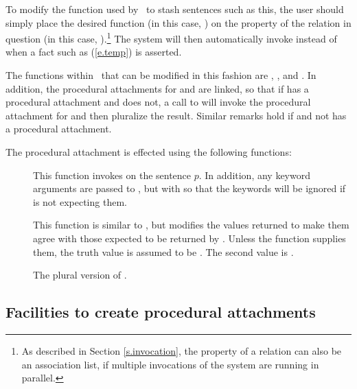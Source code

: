 To modify the function used by \mvl\ to stash sentences such as this,
the user should simply place the desired function (in this case,
) on the  property of the relation in
question (in this case, ).\footnote{As described in
Section \ref{s.invocation}, the  property of a relation
can also be an association list, if multiple invocations of the
system are running in parallel.} The system will then automatically
invoke  instead of  when a fact such
as (\ref{e.temp}) is asserted.

The functions within \mvl\ that can be modified in this fashion are
, ,  and .  In
addition, the procedural attachments for  and
 are linked, so that if  has a procedural
attachment and  does not, a call to  will
invoke the procedural attachment for  and then pluralize
the result.  Similar remarks hold if  and not
 has a procedural attachment.

The procedural attachment is effected using the following functions:
 \begin{description}
 \item [] This function invokes  on the
sentence $p$.  In addition, any keyword arguments are passed to
, but with  so that the keywords
will be ignored if  is not expecting them.
 \item [] This function is similar to
, but modifies the values returned to make them agree
with those expected to be returned by .  Unless the
function  supplies them, the truth value is assumed to be
.  The second value is .
 \item [] The plural version of
.
 \end{description}

\subsection{Facilities to create procedural attachments}

